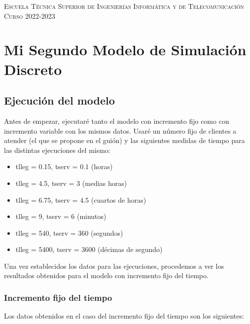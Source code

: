 \documentclass[11pt,a4paper]{report}
\begin{document}
\begin{titlepage}
\begin{minipage}{\textwidth}
\vspace{0.7cm}
\textsc{Escuela Técnica Superior de Ingenierías Informática y de Telecomunicación}\\
\vspace{1cm}
\textsc{Curso 2022-2023}
\end{minipage}
\end{titlepage}

\tableofcontents
\thispagestyle{empty}				%

\newpage

\setlength{\parskip}{1em}

\chapter{Mi Segundo Modelo de Simulación Discreto}
\newpage
\section{Ejecución del modelo}

Antes de empezar, ejecutaré tanto el modelo con incremento fijo como con incremento variable con los mismos datos. Usaré un número fijo de clientes a atender (el que se propone en el guión) y las siguientes medidas de tiempo para las distintas ejecuciones del mismo:

\begin{itemize}
	\item{tlleg = 0.15, tserv = 0.1 (horas)}
	\item{tlleg = 4.5, tserv = 3 (medias horas)}
	\item{tlleg = 6.75, tserv = 4.5 (cuartos de horas)}
	\item{tlleg = 9, tserv = 6 (minutos)}
	\item{tlleg = 540, tserv = 360 (segundos)}
	\item{tlleg = 5400, tserv = 3600 (décimas de segundo)}
\end{itemize}

Una vez establecidos los datos para las ejecuciones, procedemos a ver los resultados obtenidos para el modelo con incremento fijo del tiempo.

\subsection{Incremento fijo del tiempo}

Los datos obtenidos en el caso del incremento fijo del tiempo son los siguientes:
\end{document}

